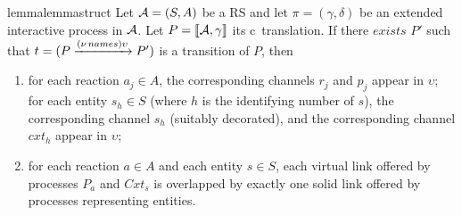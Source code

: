  \begin{restatable}[]{lemma}{lemmastruct}
 \label{lem:struct}
  Let ${\cal A} = (S, A)$ be a RS and let $\pi=(\gamma,\delta)$ be an extended  interactive process in ${\cal A}$. Let $P=\llbracket{\cal A},\gamma\rrbracket$ its c\CNA~translation. If there $exists$ $P'$ such that $t= (P \xrightarrow{(\nu\, names)\upsilon} P')$ is a transition of $P$, then
  \begin{enumerate}
  \item for each reaction  $a_j \in A$, the corresponding channels $r_j$ and $p_j$ appear in  $\upsilon$; for each entity $s_h \in S$ (where $h$ is the identifying number of $s$), the corresponding channel $s_h$ (suitably decorated), and the corresponding channel $cxt_h$ appear in $\upsilon$; 
  \item for each reaction $a \in A$ and each entity $s \in S$, each virtual link offered by processes $P_a$ and $Cxt_s$ is  overlapped by exactly one solid link offered by  processes representing entities.
\end{enumerate}
\end{restatable}
 
